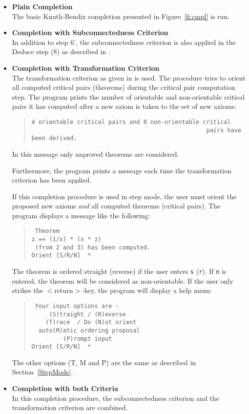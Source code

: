 \begin{itemize}
\item {\bf Plain Completion}\\
The basic Knuth-Bendix completion presented in Figure~\ref{fi:cmpl}  is run.

\item {\bf Completion with Subconnectedness Criterion}\\
In addition to step 6', 
the subconnectedness criterion is also applied in the Deduce step (8)
as described in \cite{Kuechlin:86}.

\item {\bf Completion with Transformation Criterion}\\
The transformation criterion as given in \cite{Buendgen:91,Buendgen:91b}
is used.
The procedure tries to orient all computed critical pairs (theorems) 
during the critical pair computation step.
The program prints the number of orientable and non-orientable critical pairs
it has computed after a new axiom is taken to the set of new axioms:
\begin{quote}
\begin{verbatim}
4 orientable critical pairs and 0 non-orientable critical 
                                                  pairs have been derived.
\end{verbatim}
\end{quote}
In this message only unproved theorems are considered.

Furthermore, the program prints a message each time  the transformation
criterion has been applied.

If this completion procedure  is used in step mode, the user must orient
the proposed new axioms {\em and} all computed 
theorems (critical pairs). The program displays a message like the following:
\begin{quote}
\begin{verbatim}
 Theorem
z == (1/x) * (x * z)
 (from 2 and 3) has been computed.
Orient [S/R/N]  *
\end{verbatim}
\end{quote}
The theorem is ordered straight (reverse) if the user enters {\tt s}
({\tt r}). If {\tt n} is entered, the theorem will be considered as
non-orientable. If the user only strikes the $<$return$>$-key, the program
will display a help menu:
\begin{quote}
\begin{verbatim}
 Your input options are -
     (S)traight / (R)everse
    (T)race  / Do (N)ot orient
  auto(M)atic ordering proposal
         (P)rompt input
Orient [S/R/N]  *
\end{verbatim}
\end{quote}
The other options (T, M and P) are the same as described in
Section~\ref{StepMode}.

\item {\bf Completion with both Criteria}\\
In this completion procedure, the subconnectedness criterion and the
transformation criterion are combined.
\end{itemize}

